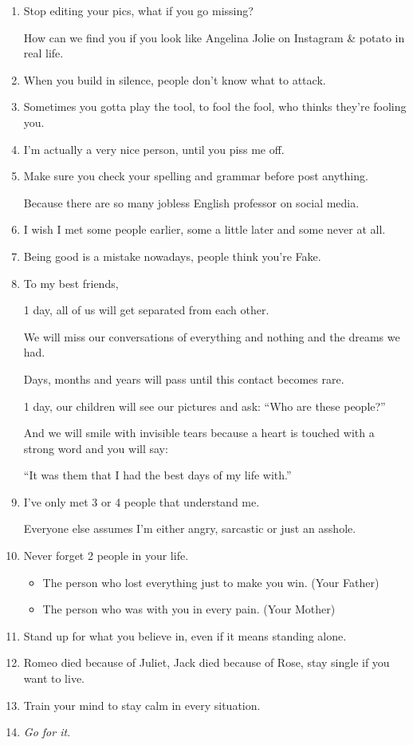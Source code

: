 \documentclass{article}
\numberwithin{equation}{section}
\begin{document}
\begin{enumerate}
    Because my mistakes are to be corrected by me, not by others.
    \item Stop editing your pics, what if you go missing?
    
    How can we find you if you look like Angelina Jolie on Instagram \& potato in real life.
    \item When you build in silence, people don't know what to attack.
    \item Sometimes you gotta play the tool, to fool the fool, who thinks they're fooling you.
    \item I'm actually a very nice person, until you piss me off.
    \item Make sure you check your spelling and grammar before post anything.
    
    Because there are so many jobless English professor on social media.
    \item I wish I met some people earlier, some a little later and some never at all.
    \item Being good is a mistake nowadays, people think you're Fake.
    \item To my best friends,
    
    1 day, all of us will get separated from each other.
    
    We will miss our conversations of everything and nothing and the dreams we had.
    
    Days, months and years will pass until this contact becomes rare.
    
    1 day, our children will see our pictures and ask: ``Who are these people?''
    
    And we will smile with invisible tears because a heart is touched with a strong word and you will say:
    
    ``It was them that I had the best days of my life with.''
    \item I've only met 3 or 4 people that understand me.
    
    Everyone else assumes I'm either angry, sarcastic or just an asshole.
    \item Never forget 2 people in your life.
    \begin{itemize}
        \item[1.] The person who lost everything just to make you win. (Your Father)
        \item[2.] The person who was with you in every pain. (Your Mother)
    \end{itemize}
    \item Stand up for what you believe in, even if it means standing alone.
    \item Romeo died because of Juliet, Jack died because of Rose, stay single if you want to live.
    \item Train your mind to stay calm in every situation.
    \item \textit{Go for it}.
    

\end{enumerate}
\end{document}
